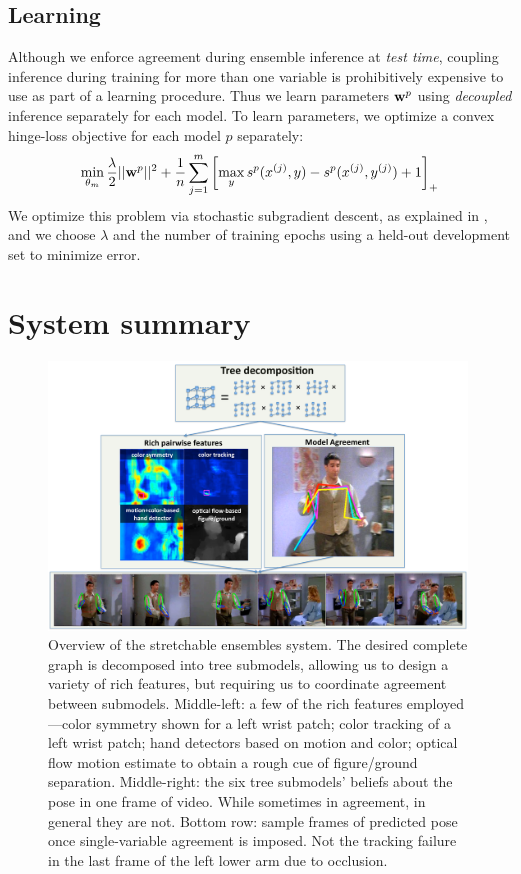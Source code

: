 \subsection{Learning} Although we enforce agreement during ensemble inference 
at {\em test time}, coupling inference during training for more than one 
variable is prohibitively expensive to use as part of a learning procedure.  
Thus we learn
parameters $\mathbf{w}^p$ using {\em decoupled} inference separately for
each model. To learn parameters, we optimize a convex hinge-loss
objective for each model $p$ separately:
 \begin{align}
\min_{\theta_m} \frac{\lambda}{2}||\mathbf{w}^p||^2 +
\frac{1}{n}\sum_{j=1}^m \left[ \max_y s^p(x^{(j)},y) - s^p(x^{(j)},y^{(j)})
+1\right]_+
\end{align}
We optimize this problem via stochastic subgradient descent, as explained in 
, and we choose
$\lambda$ and the number of training epochs using a held-out
development set to minimize error.


\section{System summary}
\begin{figure}[tb]
\begin{center}
\includegraphics[width=0.99\textwidth]{figs/esm-overview2.pdf}
\caption[Stretchable Models system overview.]{ Overview of the stretchable 
ensembles system.  The desired complete graph is decomposed into tree 
submodels, allowing us to design a variety of rich features, but requiring us 
to coordinate agreement between submodels.  Middle-left: a few of the rich 
features employed---color symmetry shown for a left wrist patch; color tracking 
of a left wrist patch; hand detectors based on motion and color; optical flow 
motion estimate to obtain a rough cue of figure/ground separation.  
Middle-right: the six tree submodels' beliefs about the pose in one frame of 
video.  While sometimes in agreement, in general they are not.  Bottom row: 
sample frames of predicted pose once single-variable agreement is imposed.  Not 
the tracking failure in the last frame of the left lower arm due to occlusion.  
} \label{fig:esm-overview2}
\end{center}
\end{figure}

